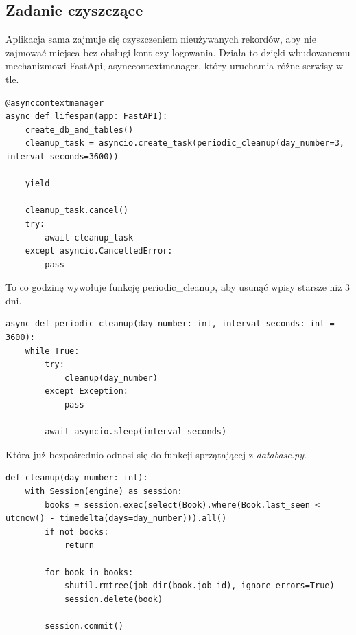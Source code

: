 \subsection{Zadanie czyszczące}
Aplikacja sama zajmuje się czyszczeniem nieużywanych rekordów, aby nie zajmować miejsca bez obsługi
kont czy logowania. Działa to dzięki wbudowanemu mechanizmowi FastApi, asynccontextmanager, który
uruchamia różne serwisy w tle.
\begin{lstlisting}[style=pythonStyle]
@asynccontextmanager
async def lifespan(app: FastAPI):
    create_db_and_tables()
    cleanup_task = asyncio.create_task(periodic_cleanup(day_number=3, interval_seconds=3600))
    
    yield

    cleanup_task.cancel()
    try:
        await cleanup_task
    except asyncio.CancelledError:
        pass
\end{lstlisting}
To co godzinę wywołuje funkcję periodic\_cleanup, aby usunąć wpisy starsze niż 3 dni.
\begin{lstlisting}[style=pythonStyle]
async def periodic_cleanup(day_number: int, interval_seconds: int = 3600):
    while True:
        try:
            cleanup(day_number)
        except Exception:
            pass
        
        await asyncio.sleep(interval_seconds)
\end{lstlisting}
Która już bezpośrednio odnosi się do funkcji sprzątającej z \textit{database.py}.
\begin{lstlisting}[style=pythonStyle]
def cleanup(day_number: int):
    with Session(engine) as session:
        books = session.exec(select(Book).where(Book.last_seen < utcnow() - timedelta(days=day_number))).all()
        if not books:
            return

        for book in books:
            shutil.rmtree(job_dir(book.job_id), ignore_errors=True)
            session.delete(book)
        
        session.commit()
\end{lstlisting}

